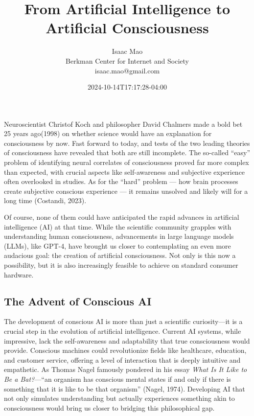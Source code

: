 \documentclass[
]{article}
\title{From Artificial Intelligence to Artificial Consciousness}
\author{Isaac Mao\\ Berkman Center for Internet and Society \\isaac.mao@gmail.com}
\date{2024-10-14T17:17:28-04:00}
\begin{document}
\maketitle

Neuroscientist Christof Koch and philosopher David Chalmers made a bold
bet 25 years ago(1998) on whether science would have an explanation for
consciousness by now. Fast forward to today, and tests of the two
leading theories of consciousness have revealed that both are still
incomplete. The so-called ``easy'' problem of identifying neural
correlates of consciousness proved far more complex than expected, with
crucial aspects like self-awareness and subjective experience often
overlooked in studies. As for the ``hard'' problem --- how brain
processes create subjective conscious experience --- it remains unsolved
and likely will for a long time (Costandi, 2023).

Of course, none of them could have anticipated the rapid advances in
artificial intelligence (AI) at that time. While the scientific
community grapples with understanding human consciousness, advancements
in large language models (LLMs), like GPT-4, have brought us closer to
contemplating an even more audacious goal: the creation of artificial
consciousness. Not only is this now a possibility, but it is also
increasingly feasible to achieve on standard consumer hardware.

\hypertarget{the-advent-of-conscious-ai}{%
\subsection{The Advent of Conscious
AI}\label{the-advent-of-conscious-ai}}

The development of conscious AI is more than just a scientific
curiosity---it is a crucial step in the evolution of artificial
intelligence. Current AI systems, while impressive, lack the
self-awareness and adaptability that true consciousness would provide.
Conscious machines could revolutionize fields like healthcare,
education, and customer service, offering a level of interaction that is
deeply intuitive and empathetic. As Thomas Nagel famously pondered in
his essay \emph{What Is It Like to Be a Bat?}---``an organism has
conscious mental states if and only if there is something that it is
like to be that organism'' (Nagel, 1974). Developing AI that not only
simulates understanding but actually experiences something akin to
consciousness would bring us closer to bridging this philosophical gap.
\end{document}
